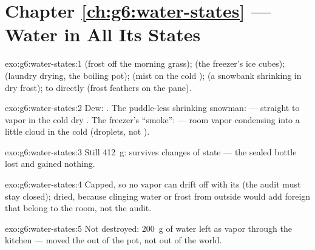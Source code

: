 \section*{Chapter \ref{ch:g6:water-states} --- Water in All Its States}

\begin{solution}{exo:g6:water-states:1}
 (frost off the morning grass);  (the
freezer's ice cubes);  (laundry drying, the boiling
pot);  (mist on the cold );  (a
snowbank shrinking in dry frost);  to  directly (frost
feathers on the pane).
\end{solution}

\begin{solution}{exo:g6:water-states:2}
Dew: . The puddle-less shrinking snowman: 
---  straight to vapor in the cold dry . The freezer's
``smoke'':  --- room vapor condensing into a little
cloud in the cold  (droplets, not ).
\end{solution}

\begin{solution}{exo:g6:water-states:3}
Still \qty{412}{g}:  survives changes of state --- the sealed
bottle lost and gained nothing.
\end{solution}

\begin{solution}{exo:g6:water-states:4}
Capped, so no vapor can drift off with its  (the audit must
stay closed); dried, because clinging water or frost from outside
would add foreign  that belong to the room, not the audit.
\end{solution}

\begin{solution}{exo:g6:water-states:5}
Not destroyed: \qty{200}{g} of water left as vapor through the
kitchen  ---  moved the  out of the pot, not
out of the world.
\end{solution}

